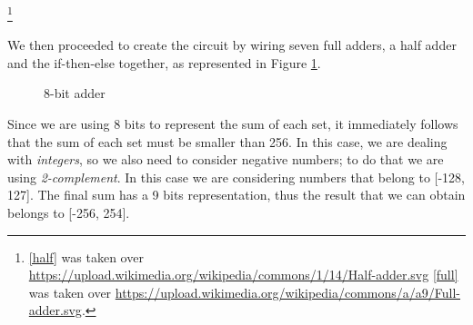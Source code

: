 \documentclass[12pt]{article}
\begin{document}
\footnote{\ref{half} was taken over \url{https://upload.wikimedia.org/wikipedia/commons/1/14/Half-adder.svg} 
\ref{full} was taken over \url{https://upload.wikimedia.org/wikipedia/commons/a/a9/Full-adder.svg}.}

We then proceeded to create the circuit by wiring seven full adders, a half adder and the if-then-else together, as represented in Figure \ref{circuit}.

\begin{figure}[!h]
    \caption{8-bit adder}\label{circuit}
\end{figure}
Since we are using 8 bits to represent the sum of each set, it immediately follows that the sum of each set must be smaller than 256. In this case, we are dealing with \textit{integers}, so we also need to consider negative numbers; to do that we are using \textit{2-complement}. In this case we are considering numbers that belong to [-128, 127]. The final sum has a 9 bits representation, thus the result that we can obtain belongs to [-256, 254]. 
\end{document}
